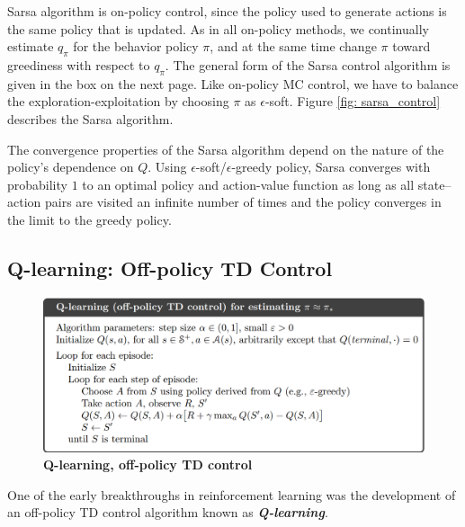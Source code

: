 \documentclass[11pt]{article}
\begin{document}
Sarsa algorithm is on-policy control, since the policy used to generate actions is the same policy that is updated. As in all on-policy methods, we continually estimate $q_{\pi}$ for the behavior policy $\pi$, and at the same time change $\pi$ toward greediness with respect to $q_{\pi}$. The general form of the Sarsa control algorithm is given in the box on the next page. Like on-policy MC control, we have to balance the exploration-exploitation by choosing $\pi$ as $\epsilon$-soft. Figure \ref{fig: sarsa_control} describes the Sarsa algorithm. 

The convergence properties of the Sarsa algorithm depend on the nature of the policy’s dependence on $Q$. Using $\epsilon$-soft/$\epsilon$-greedy policy, Sarsa converges
with probability $1$ to an optimal policy and action-value function as long as all state–action pairs are visited an infinite number of times and the policy converges in the limit to the greedy policy.

\subsection{Q-learning: Off-policy TD Control}
\begin{figure}
\begin{minipage}[t]{1\linewidth}
  \centering
  \centerline{\includegraphics[scale = 0.3]{q_learning.png}}
\end{minipage}
\caption{\footnotesize{\textbf{Q-learning, off-policy TD control}}}
\label{fig: q_learning}
\end{figure}
One of the early breakthroughs in reinforcement learning was the development of an off-policy TD control algorithm known as \textbf{\emph{Q-learning}}.
 
\end{document}
